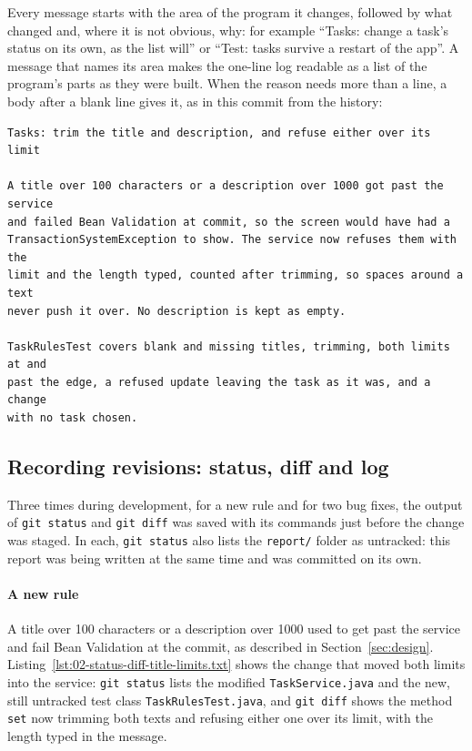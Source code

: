 Every message starts with the area of the program it changes, followed by what changed and, where it is not obvious,
why: for example ``Tasks: change a task's status on its own, as the list will'' or ``Test: tasks survive a restart of
the app''. A message that names its area makes the one-line log readable as a list of the program's parts as they
were built. When the reason needs more than a line, a body after a blank line gives it, as in this commit from the
history:
\begin{lstlisting}[style=terminal]
Tasks: trim the title and description, and refuse either over its limit

A title over 100 characters or a description over 1000 got past the service
and failed Bean Validation at commit, so the screen would have had a
TransactionSystemException to show. The service now refuses them with the
limit and the length typed, counted after trimming, so spaces around a text
never push it over. No description is kept as empty.

TaskRulesTest covers blank and missing titles, trimming, both limits at and
past the edge, a refused update leaving the task as it was, and a change
with no task chosen.
\end{lstlisting}

\subsection{Recording revisions: status, diff and log}

Three times during development, for a new rule and for two bug fixes, the output of \texttt{git status} and
\texttt{git diff} was saved with its commands just before the change was staged. In each, \texttt{git status} also
lists the \texttt{report/} folder as untracked: this report was being written at the same time and was committed on
its own.

\paragraph*{A new rule} A title over 100 characters or a description over 1000 used to get past the service and fail
Bean Validation at the commit, as described in Section~\ref{sec:design}. Listing~\ref{lst:02-status-diff-title-limits.txt}
shows the change that moved both limits into the service: \texttt{git status} lists the modified
\texttt{TaskService.java} and the new, still untracked test class \texttt{TaskRulesTest.java}, and \texttt{git diff}
shows the method \texttt{set} now trimming both texts and refusing either one over its limit, with the length typed in
the message.

